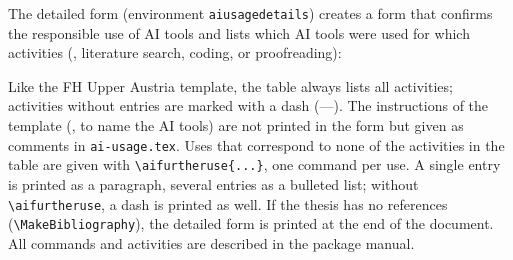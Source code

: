 The detailed form (environment \texttt{aiusagedetails}) creates a form that
confirms the responsible use of AI tools and lists which AI tools were used for
which activities (\eg, literature search, coding, or proofreading):
%
\begin{LaTeXCode}[numbers=none]
\begin{aiusagedetails}
\end{aiusagedetails}
\end{LaTeXCode}
%
Like the FH Upper Austria template, the table always lists all activities;
activities without entries are marked with a dash (---). The instructions of
the template (\eg, to name the AI tools) are not printed in the form but given
as comments in \verb!ai-usage.tex!. Uses that correspond to none of the
activities in the table are given with \verb!\aifurtheruse{...}!, one command
per use. A single entry is printed as a paragraph, several entries as a
bulleted list; without \verb!\aifurtheruse!, a dash is printed as well.
If the thesis has no references (\verb!\MakeBibliography!), the detailed form
is printed at the end of the document.
All commands and activities are described in the package manual.
